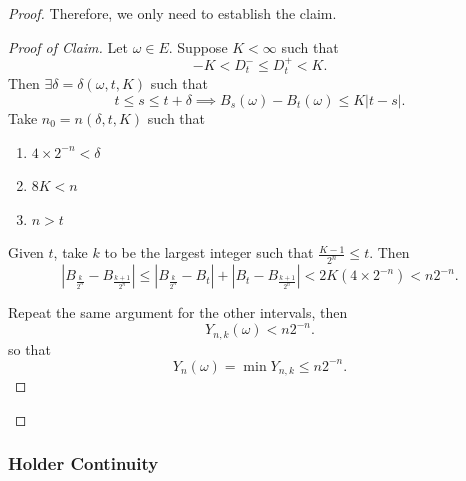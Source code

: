 \begin{proof}
	Therefore, we only need to establish the claim.
	\begin{proof}[Proof of Claim]
		Let $\omega \in E$. Suppose $K < \infty $ such that
		\[
			- K < D_t^- \le D_t^+ < K
		.\] 
		Then $\exists  \delta = \delta(\omega, t, K)$ such that 
		\[
			t \le  s \le  t+  \delta
			\implies
			B_s(\omega) - B_t(\omega) \le  K|t - s|
		.\] 
		Take $n_0 = n(\delta, t, K)$ such that
		\begin{enumerate}
			\item $4 \times 2^{-n} < \delta$
			\item $8 K < n$
			\item  $n > t$
		\end{enumerate}
		Given $t$, take $k $ to be the largest integer such that $\frac{K - 1}{2^n} \le t$. Then 
		\[
			\left| B_{\frac{k}{2^n}} - B_{\frac{k+1}{2^n}} \right| 
			\le \left| B_{\frac{k}{2^n}} - B_t \right| + \left| B_t - B_{\frac{k+1}{2^n}} \right| 
			< 2 K (4 \times 2^{-n}) < n 2 ^{-n}
		.\] 

		Repeat the same argument for the other intervals, then
		\[
			Y_{n, k}(\omega) <  n 2^{-n}
		.\] 
		so that
		\[
			Y_n(\omega) = \min Y_{n, k} \le  n 2^{-n}
		.\] 
	\end{proof}


\end{proof}

\subsubsection{Holder Continuity}

